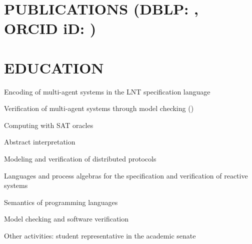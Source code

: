 \documentclass[a4paper]{deedy-resume-openfont}
\begin{document}
\hfill
\begin{minipage}[t]{0.67\textwidth} 

\section[Publications]{PUBLICATIONS \small{(DBLP\@: \href{https://dblp.org/pid/215/9758}{}, ORCID iD\@: \href{https://orcid.org/0000-0003-1922-3151}{})}}
\vspace{\topsep} %

\nocite{*}

\sectionsep%


\section{EDUCATION}

\begin{tightemize}
    \item Encoding of multi-agent systems in the LNT specification language
    \item Verification of multi-agent systems through model checking (\href{https://cadp.inria.fr/}{})
\end{tightemize}
\sectionsep%

\begin{tightemize}
    \item Computing with SAT oracles
    \item Abstract interpretation
    \item Modeling and verification of distributed protocols
\end{tightemize}
\sectionsep%

\begin{tightemize}
\item Languages and process algebras for the specification and verification of reactive systems
\item Semantics of programming languages
\item Model checking and software verification
\end{tightemize}
Other activities: student representative in the academic senate
\sectionsep%


\end{minipage}
\end{document}
